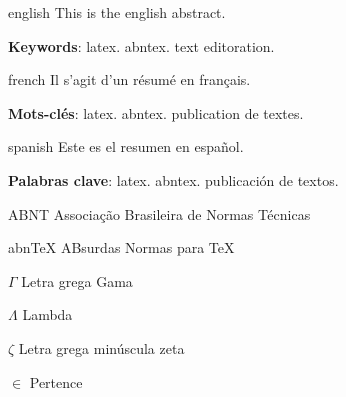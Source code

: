 \documentclass[12pt,openright,twoside,a4paper,
english,french,spanish,brazil]{abntex2}
\begin{document}
		\begin{resumo}[Abstract]
			\begin{otherlanguage*}{english}
				This is the english abstract.
				
				\vspace{\onelineskip}
				
				\noindent 
				\textbf{Keywords}: latex. abntex. text editoration.
			\end{otherlanguage*}
		\end{resumo}
		
		\begin{resumo}[Résumé]
			\begin{otherlanguage*}{french}
				Il s'agit d'un résumé en français.
				
				\textbf{Mots-clés}: latex. abntex. publication de textes.
			\end{otherlanguage*}
		\end{resumo}
		
		\begin{resumo}[Resumen]
			\begin{otherlanguage*}{spanish}
				Este es el resumen en español.
				
				\textbf{Palabras clave}: latex. abntex. publicación de textos.
			\end{otherlanguage*}
		\end{resumo}
		
		\listoffigures*
		\cleardoublepage
		
		\listoftables*
		\cleardoublepage
		
		\begin{siglas}
			\item[ABNT] Associação Brasileira de Normas Técnicas
			\item[abnTeX] ABsurdas Normas para TeX
		\end{siglas}
		
		\begin{simbolos}
			\item[$ \Gamma $] Letra grega Gama
			\item[$ \Lambda $] Lambda
			\item[$ \zeta $] Letra grega minúscula zeta
			\item[$ \in $] Pertence
		\end{simbolos}
		
\end{document}
